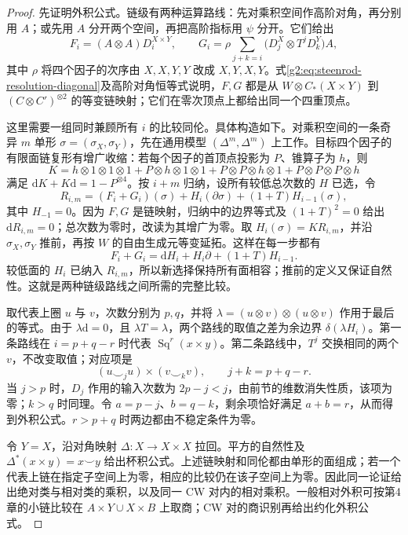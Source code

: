 \begin{proof}
	先证明外积公式。链级有两种运算路线：先对乘积空间作高阶对角，再分别用 \(A\)；或先用 \(A\) 分开两个空间，再把高阶指标用 \(\psi\) 分开。它们给出
	\[
		F_i=(A\otimes A)D_i^{X\times Y},\qquad
		G_i=\rho\sum_{j+k=i}\bigl(D_j^X\otimes T^jD_k^Y\bigr)A,
	\]
	其中 \(\rho\) 将四个因子的次序由 \(X,X,Y,Y\) 改成 \(X,Y,X,Y\)。式\eqref{g2:eq:steenrod-resolution-diagonal}及高阶对角恒等式说明，\(F,G\) 都是从 \(W\otimes C_*(X\times Y)\) 到 \((C\otimes C')^{\otimes2}\) 的等变链映射；它们在零次顶点上都给出同一个四重顶点。

	这里需要一组同时兼顾所有 \(i\) 的比较同伦。具体构造如下。对乘积空间的一条奇异 \(m\) 单形 \(\sigma=(\sigma_X,\sigma_Y)\)，先在通用模型 \((\Delta^m,\Delta^m)\) 上工作。目标四个因子的有限面链复形有增广收缩：若每个因子的首顶点投影为 \(P\)、锥算子为 \(h\)，则
	\[
		K=h\otimes1\otimes1\otimes1+P\otimes h\otimes1\otimes1
		+P\otimes P\otimes h\otimes1+P\otimes P\otimes P\otimes h
	\]
	满足 \(\mathrm dK+K\mathrm d=1-P^{\otimes4}\)。按 \(i+m\) 归纳，设所有较低总次数的 \(H\) 已选，令
	\[
		R_{i,m}=(F_i+G_i)(\sigma)+H_i(\partial\sigma)+(1+T)H_{i-1}(\sigma),
	\]
	其中 \(H_{-1}=0\)。因为 \(F,G\) 是链映射，归纳中的边界等式及 \((1+T)^2=0\) 给出 \(\mathrm dR_{i,m}=0\)；总次数为零时，改读为其增广为零。取 \(H_i(\sigma)=KR_{i,m}\)，并沿 \(\sigma_X,\sigma_Y\) 推前，再按 \(W\) 的自由生成元等变延拓。这样在每一步都有
	\[
		F_i+G_i=\mathrm dH_i+H_i\partial+(1+T)H_{i-1}.
	\]
	较低面的 \(H_i\) 已纳入 \(R_{i,m}\)，所以新选择保持所有面相容；推前的定义又保证自然性。这就是两种链级路线之间所需的完整比较。

	取代表上圈 \(u\) 与 \(v\)，次数分别为 \(p,q\)，并将 \(\lambda=(u\otimes v)\otimes(u\otimes v)\) 作用于最后的等式。由于 \(\lambda\mathrm d=0\)，且 \(\lambda T=\lambda\)，两个路线的取值之差为余边界 \(\delta(\lambda H_i)\)。第一条路线在 \(i=p+q-r\) 时代表 \(\operatorname{Sq}^r(x\times y)\)。第二条路线中，\(T^j\) 交换相同的两个 \(v\)，不改变取值；对应项是
	\[
		(u\smile_j u)\times(v\smile_k v),\qquad j+k=p+q-r.
	\]
	当 \(j>p\) 时，\(D_j\) 作用的输入次数为 \(2p-j<j\)，由前节的维数消失性质，该项为零；\(k>q\) 时同理。令 \(a=p-j\)、\(b=q-k\)，剩余项恰好满足 \(a+b=r\)，从而得到外积公式。\(r>p+q\) 时两边都由不稳定条件为零。

	令 \(Y=X\)，沿对角映射 \(\Delta:X\to X\times X\) 拉回。平方的自然性及 \(\Delta^*(x\times y)=x\smile y\) 给出杯积公式。上述链映射和同伦都由单形的面组成；若一个代表上链在指定子空间上为零，相应的比较仍在该子空间上为零。因此同一论证给出绝对类与相对类的乘积，以及同一 CW 对内的相对乘积。一般相对外积可按第4章的小链比较在 \(A\times Y\cup X\times B\) 上取商；CW 对的商识别再给出约化外积公式。
\end{proof}


